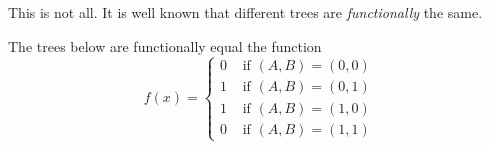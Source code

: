   This is not all. It is well known that different trees are \textit{functionally} the same. 

  \begin{example}
    \label{ex:model-equivalence}
    The trees below are functionally equal the function 
    \begin{equation}
      f(x) = \begin{cases} 
        0 & \text{ if } (A, B) = (0, 0) \\
        1 & \text{ if } (A, B) = (0, 1) \\
        1 & \text{ if } (A, B) = (1, 0) \\
        0 & \text{ if } (A, B) = (1, 1)
      \end{cases}
    \end{equation}


\end{example}
